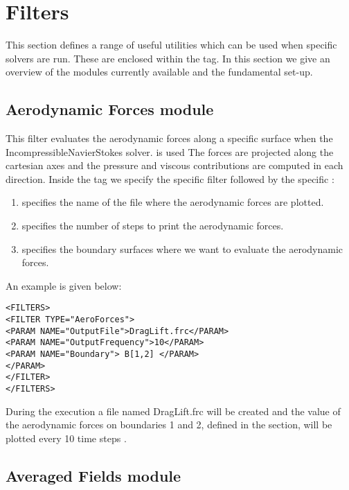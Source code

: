 \section{Filters}

This section defines a range of useful utilities which can be used when specific solvers are run. These are enclosed within the
 tag. In this section we give an overview of the modules currently available and the fundamental set-up. 

\subsection{Aerodynamic Forces module}

This filter evaluates the aerodynamic forces along a specific surface when the IncompressibleNavierStokes solver. is used The forces are projected along the cartesian axes and the pressure and viscous contributions are computed in each direction. Inside the  tag we specify the specific filter  followed by the specific :

\begin{enumerate}
\item {} specifies the name of the file where the aerodynamic forces are plotted.
\item  {} specifies the number of steps to print the aerodynamic forces.
\item {} specifies the boundary surfaces where we want to evaluate the aerodynamic forces.
\end{enumerate}

An example is given below:

\begin{lstlisting}[style=XMLStyle]
<FILTERS>
<FILTER TYPE="AeroForces">
<PARAM NAME="OutputFile">DragLift.frc</PARAM>
<PARAM NAME="OutputFrequency">10</PARAM>
<PARAM NAME="Boundary"> B[1,2] </PARAM>		
</PARAM>
</FILTER>
</FILTERS>
\end{lstlisting}

During the execution  a file named DragLift.frc will be created and the value of the aerodynamic forces on boundaries 1 and 2, defined in the  section, will be plotted every 10 time steps .

\subsection{Averaged Fields module}

